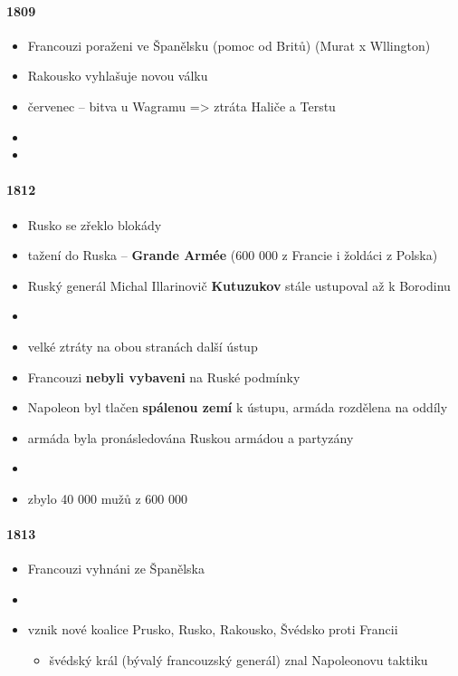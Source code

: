 \paragraph{1809}
\begin{itemize}
\item Francouzi poraženi ve Španělsku (pomoc od Britů)  (Murat x Wllington)
\item Rakousko vyhlašuje novou válku
\item červenec -- bitva u Wagramu => ztráta Haliče a Terstu
\item {}
\item {} 
\end{itemize}

\paragraph{1812}
\begin{itemize}
\item Rusko se zřeklo blokády
\item[\ra] tažení do Ruska -- \textbf{Grande Armée} (600 000 z Francie i žoldáci z Polska)
\item Ruský generál Michal Illarinovič \textbf{Kutuzukov} stále ustupoval až k Borodinu
\item {}
\item velké ztráty na obou stranách \ra další ústup
\item Francouzi \textbf{nebyli vybaveni} na Ruské podmínky
\item Napoleon byl tlačen \textbf{spálenou zemí} k ústupu, armáda rozdělena na oddíly
\item armáda byla pronásledována Ruskou armádou a partyzány
\item {}
\item zbylo 40 000 mužů z 600 000
\end{itemize}

\paragraph{1813}
\begin{itemize}
\item Francouzi vyhnáni ze Španělska
\item {}
\item vznik nové koalice Prusko, Rusko, Rakousko, Švédsko proti Francii
	\begin{itemize}
	\item švédský král (bývalý francouzský generál) znal Napoleonovu taktiku
	\end{itemize}
\end{itemize}

